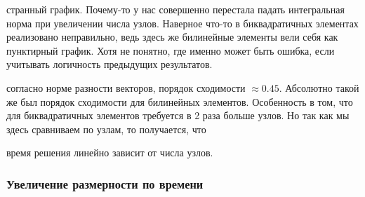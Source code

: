 \noindent{}

\conclusion странный график. Почему-то у нас совершенно перестала падать интегральная норма при увеличении числа узлов. Наверное что-то в биквадратичных элементах реализовано неправильно, ведь здесь же билинейные элементы вели себя как пунктирный график. Хотя не понятно, где именно может быть ошибка, если учитывать логичность предыдущих результатов.

\noindent{}

\conclusion согласно норме разности векторов, порядок сходимости $\approx 0.45$. Абсолютно такой же был порядок сходимости для билинейных элементов. Особенность в том, что для биквадратичных элементов требуется в 2 раза больше узлов. Но так как мы здесь сравниваем по узлам, то получается, что 

\noindent{}

\conclusion время решения линейно зависит от числа узлов.

\subsubsection{Увеличение размерности по времени}

